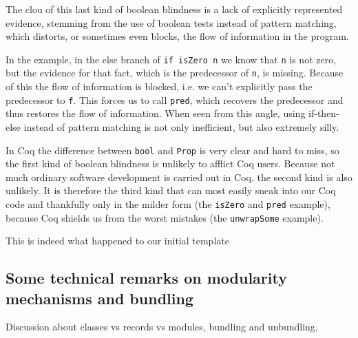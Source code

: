 \documentclass[declaration,mgr,english,shortabstract]{iithesis}
\newcommand{\m}[1]{\texttt{#1}}
\begin{document}
The clou of this last kind of boolean blindness is a lack of explicitly represented evidence, stemming from the use of boolean tests instead of pattern matching, which distorts, or sometimes even blocks, the flow of information in the program.

In the example, in the else branch of \m{if isZero n} we know that \m{n} is not zero, but the evidence for that fact, which is the predecessor of \m{n}, is missing. Because of this the flow of information is blocked, i.e. we can't explicitly pass the predecessor to \m{f}. This forces us to call \m{pred}, which recovers the predecessor and thus restores the flow of information. When seen from this angle, using if-then-else instead of pattern matching is not only inefficient, but also extremely silly.

In Coq the difference between \m{bool} and \m{Prop} is very clear and hard to miss, so the first kind of boolean blindness is unlikely to afflict Coq users. Because not much ordinary software development is carried out in Coq, the second kind is also unlikely. It is therefore the third kind that can most easily sneak into our Coq code and thankfully only in the milder form (the \m{isZero} and \m{pred} example), because Coq shields us from the worst mistakes (the \m{unwrapSome} example).

This is indeed what happened to our initial template



\subsection{Some technical remarks on modularity mechanisms and bundling}

Discussion about classes vs records vs modules, bundling and unbundling.


\end{document}
